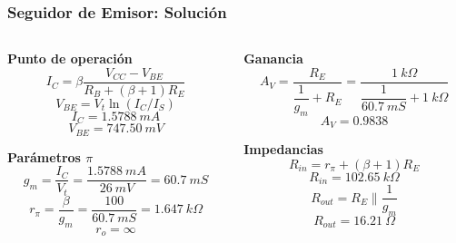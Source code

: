 \begin{frame}[t]
    \frametitle{Seguidor de Emisor: Solución}

    \begin{columns}
        \begin{column}{0.5\textwidth}
            \centering
            \textbf{Punto de operación}
            \[ I_C = \beta \dfrac{V_{CC}-V_{BE}}{R_B + (\beta+1)R_E} \]
            \[ V_{BE} = V_t \ln (I_C / I_S) \]
            \[ \boxed{I_C = 1.5788\ mA} \]
            \[ \boxed{V_{BE} = 747.50\ mV} \]

            \vspace{3mm}
            \textbf{Parámetros $\pi$}
            \[ g_m = \dfrac{I_C}{V_t} = \dfrac{1.5788\ mA}{26\ mV} = 60.7\ mS \]
            \[ r_\pi = \dfrac{\beta}{g_m} = \dfrac{100}{60.7\ mS} = 1.647\ k\Omega \]
            \[ r_o = \infty \]
        \end{column}
        \begin{column}{0.5\textwidth}
            \centering
            \textbf{Ganancia}
            \[ A_V = \dfrac{R_E}{\dfrac{1}{g_m} + R_E} = \dfrac{1\ k\Omega}{\dfrac{1}{60.7\ mS} + 1\ k\Omega} \]
            \[ \boxed{A_V = 0.9838} \]

            \vspace{3mm}
            \textbf{Impedancias}
            \[ R_{in} = r_\pi + (\beta+1) R_E \]
            \[ \boxed{R_{in} = 102.65\ k\Omega} \]
            \[ R_{out} = R_E \parallel \dfrac{1}{g_m} \]
            \[ \boxed{R_{out} = 16.21\ \Omega} \]
        \end{column}
    \end{columns}
\end{frame}

%


